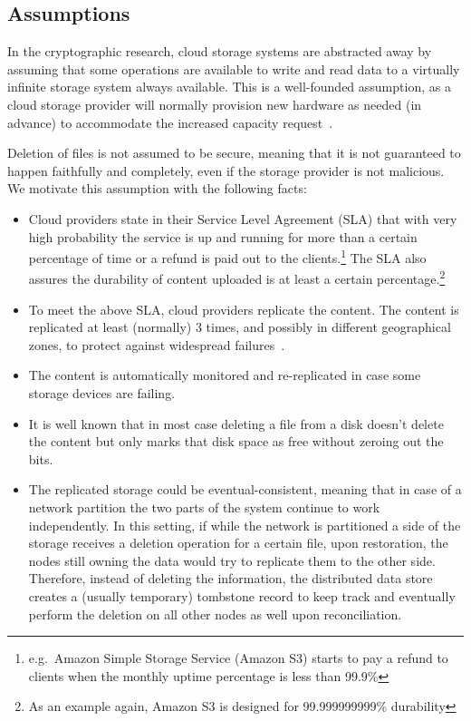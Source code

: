 \subsection{Assumptions}\label{scc:cloud-storage-assumptions}
In the cryptographic research, cloud storage systems are abstracted away by assuming
that some operations are available to write and read data to a virtually
infinite storage system always available.
This is a well-founded assumption, as a cloud storage provider
will normally provision new hardware as needed (in advance) to accommodate the
increased capacity request~\cite{AzureBlobStorage}.

Deletion of files is not assumed to be secure, meaning that it is not guaranteed to happen faithfully and completely,
even if the storage provider is not malicious.
We motivate this assumption with the following facts:
\begin{itemize}
    \item Cloud providers state in their Service Level Agreement (SLA) that
    with very high probability the service is up and running for more than a certain percentage of time or a refund is paid out to the clients.\footnote{e.g.\ Amazon Simple Storage Service (Amazon S3) starts to pay a refund to clients when the monthly uptime percentage is less than 99.9\%}
    The SLA also assures the durability of content uploaded is at least a certain percentage.\footnote{As an example again, Amazon S3 is designed for 99.999999999\% durability}
    \item To meet the above SLA, cloud providers replicate the content. The content is replicated at least (normally) 3 times, and possibly in different geographical zones, to protect against widespread failures~\cite{AzureBlobStorage}.
    \item The content is automatically monitored and re-replicated in case some storage devices are failing.
    \item It is well known that in most case deleting a file from a disk doesn't delete the content but only marks that disk space as free without zeroing out the bits.
    \item The replicated storage could be eventual-consistent, 
    meaning that in case of a network partition the two 
    parts of the system continue to work independently. 
    In this setting, if while the network is partitioned 
    a side of the storage receives a deletion operation 
    for a certain file, upon restoration,
    the nodes still owning the data would try to replicate 
    them to the other side.
    Therefore, instead of deleting the information, 
    the distributed data store creates a (usually temporary) 
    tombstone record to keep track and eventually perform 
    the deletion on all other nodes as well upon reconciliation.
\end{itemize}

